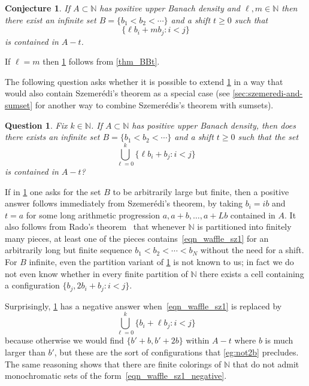 \documentclass[10pt,dvipsnames]{article}
\newtheorem{conjecture}[theorem]{Conjecture}
\newtheorem{question}[theorem]{Question}
\theoremstyle{definition}
\theoremstyle{plain}
\newcommand{\N}{\mathbb{N}}
\newcommand{\Szemeredi}{Szemer\'{e}di}
\begin{document}
\begin{conjecture}
\label{conj:k_box_j}
If $A\subset\N$ has positive upper Banach density and $\ell,m \in\N$ then there exist an infinite set $B = \{b_1 < b_2 < \cdots \}$ and a shift $t\geq 0$ such that
\begin{equation}
\label{eqn:ordered_sum}
\{ \ell b_i + m b_j : i < j \}
\end{equation}
is contained in $A-t$.
\end{conjecture}


If $\ell = m $ then \cref{conj:k_box_j} follows from \cref{thm_BBt}. 

The following question asks whether it is possible to extend \cref{conj:k_box_j} in a way that would also contain \Szemeredi{}'s theorem as a special case (see \cref{sec:szemeredi-and-sumset} for another way to combine Szemer\'edis's theorem with sumsets).



\begin{question}
\label{q_sz_waffle_sum}
Fix $k \in \N$.
If $A\subset\N$ has positive upper Banach density, then does there exists an infinite set $B=\{b_1< b_2<\cdots\}$ and a shift $t\geq 0$ such that the set
\begin{equation}
\label{eqn_waffle_sz1}
\bigcup_{\ell=0}^k \{ \ell b_i+ b_j: i < j \} 
\end{equation}
is contained in $A-t$?
\end{question}

If in \cref{q_sz_waffle_sum} one asks for the set $B$ to be arbitrarily large but finite, then a positive answer follows immediately from \Szemeredi{}'s theorem, by taking $b_i=ib$ and $t=a$ for some long arithmetic progression $a,a+b,\dots,a+Lb$ contained in $A$.
It also follows from Rado's theorem~\cite{Rado33} that whenever $\N$ is partitioned into finitely many pieces, at least one of the pieces contains~\eqref{eqn_waffle_sz1}
for an arbitrarily long but finite sequence $b_1<b_2<\cdots<b_N$ without the need for a shift. 
For $B$ infinite, even the partition variant of \cref{q_sz_waffle_sum} is not known to us; in fact we do not even know whether in every finite partition of $\N$ there exists a cell containing a configuration $\{b_j,2b_i+b_j:i<j\}$.

Surprisingly,  \cref{q_sz_waffle_sum} has a negative answer when~\eqref{eqn_waffle_sz1} is replaced by
\begin{equation}
\label{eqn_waffle_sz1_negative}
\bigcup_{\ell = 0}^k \{ b_i + \ell b_j : i < j \} 
\end{equation}
because otherwise we would find $\{ b' + b, b'+2b \}$ within $A-t$ where $b$ is much larger than $b'$, but these are the sort of configurations that \cref{eg:not2b} precludes.
The same reasoning shows that there are finite colorings of $\N$ that do not admit monochromatic sets of the form~\eqref{eqn_waffle_sz1_negative}.
\end{document}
